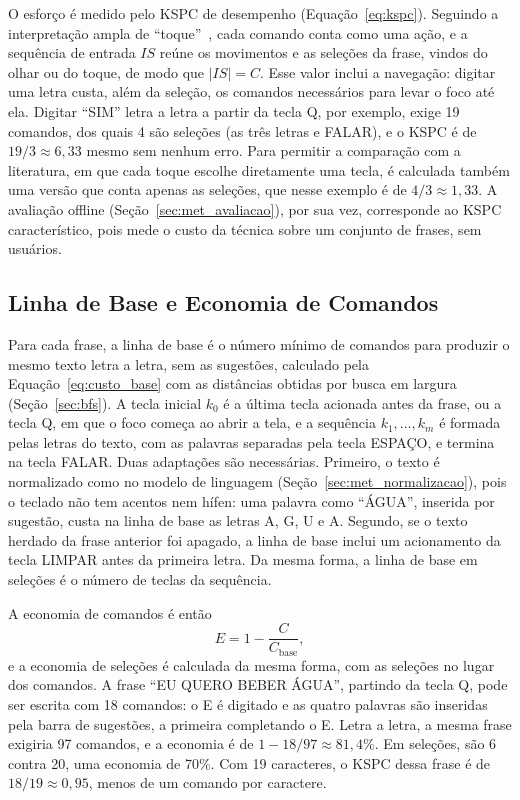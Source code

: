 O esforço é medido pelo KSPC de desempenho (Equação~\ref{eq:kspc}). Seguindo a interpretação ampla de ``toque''~\cite{wobbrock2007measures}, cada comando conta como uma ação, e a sequência de entrada $IS$ reúne os movimentos e as seleções da frase, vindos do olhar ou do toque, de modo que $|IS| = C$. Esse valor inclui a navegação: digitar uma letra custa, além da seleção, os comandos necessários para levar o foco até ela. Digitar ``SIM'' letra a letra a partir da tecla Q, por exemplo, exige 19 comandos, dos quais 4 são seleções (as três letras e FALAR), e o KSPC é de $19/3 \approx 6{,}33$ mesmo sem nenhum erro. Para permitir a comparação com a literatura, em que cada toque escolhe diretamente uma tecla, é calculada também uma versão que conta apenas as seleções, que nesse exemplo é de $4/3 \approx 1{,}33$. A avaliação offline (Seção~\ref{sec:met_avaliacao}), por sua vez, corresponde ao KSPC característico, pois mede o custo da técnica sobre um conjunto de frases, sem usuários.

\subsection{Linha de Base e Economia de Comandos} \label{sec:met_economia}

Para cada frase, a linha de base é o número mínimo de comandos para produzir o mesmo texto letra a letra, sem as sugestões, calculado pela Equação~\ref{eq:custo_base} com as distâncias obtidas por busca em largura (Seção~\ref{sec:bfs}). A tecla inicial $k_0$ é a última tecla acionada antes da frase, ou a tecla Q, em que o foco começa ao abrir a tela, e a sequência $k_1, \ldots, k_m$ é formada pelas letras do texto, com as palavras separadas pela tecla ESPAÇO, e termina na tecla FALAR. Duas adaptações são necessárias. Primeiro, o texto é normalizado como no modelo de linguagem (Seção~\ref{sec:met_normalizacao}), pois o teclado não tem acentos nem hífen: uma palavra como ``ÁGUA'', inserida por sugestão, custa na linha de base as letras A, G, U e A. Segundo, se o texto herdado da frase anterior foi apagado, a linha de base inclui um acionamento da tecla LIMPAR antes da primeira letra. Da mesma forma, a linha de base em seleções é o número de teclas da sequência.

A economia de comandos é então
\begin{equation}
    E = 1 - \frac{C}{C_{\text{base}}},
    \label{eq:economia}
\end{equation}
e a economia de seleções é calculada da mesma forma, com as seleções no lugar dos comandos. A frase ``EU QUERO BEBER ÁGUA'', partindo da tecla Q, pode ser escrita com 18 comandos: o E é digitado e as quatro palavras são inseridas pela barra de sugestões, a primeira completando o E. Letra a letra, a mesma frase exigiria 97 comandos, e a economia é de $1 - 18/97 \approx 81{,}4\%$. Em seleções, são 6 contra 20, uma economia de 70\%. Com 19 caracteres, o KSPC dessa frase é de $18/19 \approx 0{,}95$, menos de um comando por caractere.

